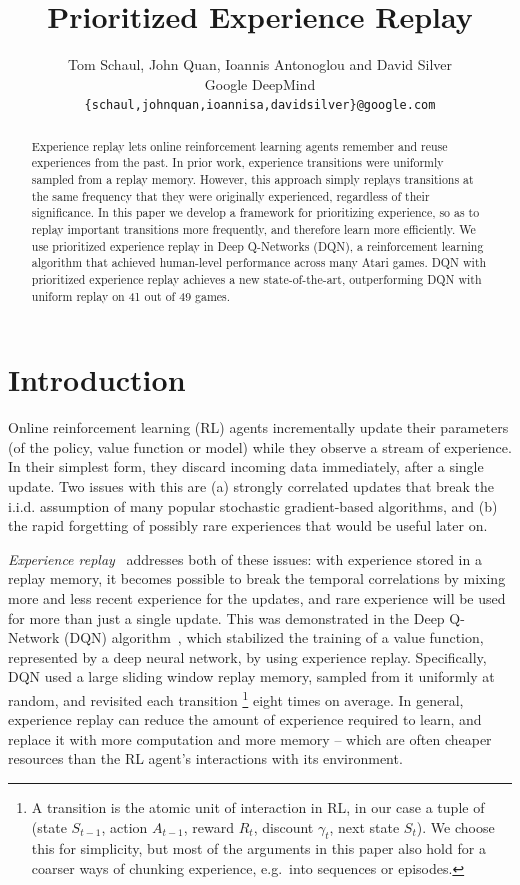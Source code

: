 \documentclass[a4paper]{article}
\title{Prioritized Experience Replay}
\author{Tom Schaul, John Quan, Ioannis Antonoglou and David Silver\\
Google DeepMind\\
\texttt{\{schaul,johnquan,ioannisa,davidsilver\}@google.com} \\
}
\begin{document}
\maketitle

\begin{abstract}
Experience replay lets online reinforcement learning agents remember and reuse experiences from the past. In prior work, experience transitions were uniformly sampled from a replay memory. However, this approach simply replays transitions at the same frequency that they were originally experienced, regardless of their significance. In this paper we develop a framework for prioritizing experience, so as to replay important transitions more frequently, and therefore learn more efficiently. We use prioritized experience replay in Deep Q-Networks (DQN), a reinforcement learning algorithm that achieved human-level performance across many Atari games. DQN with prioritized experience replay achieves a new state-of-the-art, outperforming DQN with uniform replay on 41 out of 49 games.
\end{abstract}

\section{Introduction}
Online reinforcement learning (RL) agents incrementally update their parameters
(of the policy, value function or model) while they observe a stream of
experience. In their simplest form, they discard incoming data immediately, after a single update.
Two issues with this are (a) strongly correlated updates that break the i.i.d. assumption 
of many popular stochastic gradient-based algorithms, and (b) the rapid forgetting of possibly
rare experiences that would be useful later on.

\emph{Experience replay}~\citep{lin-er} addresses both of these issues: with experience stored in a replay memory,
it becomes possible to break the temporal correlations by mixing more and less recent experience for the updates,
and rare experience will be used for more than just a single update.
This was demonstrated in the Deep Q-Network (DQN) algorithm~\citep{dqn-workshop,dqn-nature}, which stabilized the training of
a value function, represented by a deep neural network, by using experience replay. Specifically, DQN used a large sliding window replay memory, sampled from it uniformly at random, and revisited each transition%
\footnote{
A transition is the atomic unit of interaction in RL, in our case a tuple of 
(state $S_{t-1}$, action $A_{t-1}$, reward $R_{t}$, discount $\gamma_{t}$, next state $S_{t}$). 
We choose this for simplicity, but most of the arguments in this paper also hold for a coarser ways of chunking experience, e.g.\ into sequences or episodes.
}
eight times on average.
In general, experience replay can reduce the amount of experience required to learn,
and replace it with more computation and more memory -- which are often cheaper resources than the RL agent's interactions with its environment.
\end{document}
